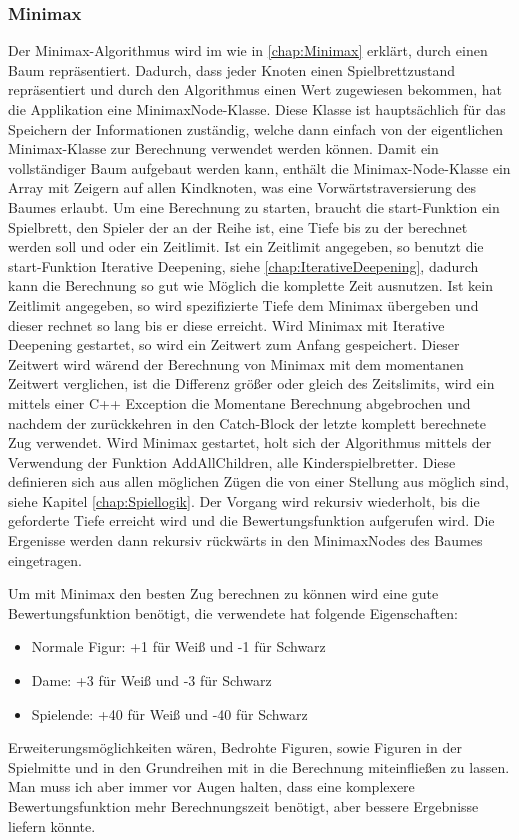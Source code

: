 \documentclass[12pt,a4paper,bibliography=totocnumbered,listof=totocnumbered]{article}
\begin{document}
\subsubsection{Minimax}
Der Minimax-Algorithmus wird im wie in \ref{chap:Minimax} erklärt, durch einen Baum repräsentiert. Dadurch, dass jeder Knoten einen Spielbrettzustand
repräsentiert und durch den Algorithmus einen Wert zugewiesen bekommen, hat die Applikation eine MinimaxNode-Klasse.
Diese Klasse ist hauptsächlich für das Speichern der Informationen zuständig, welche dann einfach von der eigentlichen Minimax-Klasse zur Berechnung
verwendet werden können. Damit ein vollständiger Baum aufgebaut werden kann, enthält die Minimax-Node-Klasse ein Array mit Zeigern auf allen 
Kindknoten, was eine Vorwärtstraversierung des Baumes erlaubt. 
Um eine Berechnung zu starten, braucht die start-Funktion ein Spielbrett, den Spieler der an der Reihe ist, eine
Tiefe bis zu der berechnet werden soll und oder ein Zeitlimit. Ist ein Zeitlimit angegeben, so benutzt die start-Funktion Iterative Deepening, siehe
\ref{chap:IterativeDeepening}, dadurch kann die Berechnung so gut wie Möglich die komplette Zeit ausnutzen. Ist kein Zeitlimit angegeben, 
so wird spezifizierte Tiefe dem Minimax übergeben und dieser rechnet so lang bis er diese erreicht. Wird Minimax mit Iterative Deepening gestartet, so
wird ein Zeitwert zum Anfang gespeichert. Dieser Zeitwert wird wärend der Berechnung von Minimax mit dem momentanen Zeitwert verglichen, ist die 
Differenz größer oder gleich des Zeitslimits, wird ein mittels einer C++ Exception die Momentane Berechnung abgebrochen und nachdem der zurückkehren in 
den Catch-Block der letzte komplett berechnete Zug verwendet. 
Wird Minimax gestartet, holt sich der Algorithmus mittels der Verwendung der Funktion AddAllChildren, alle Kinderspielbretter. Diese 
definieren sich aus allen möglichen Zügen die von einer Stellung aus möglich sind, siehe Kapitel \ref{chap:Spiellogik}. Der Vorgang wird 
rekursiv wiederholt, bis die geforderte Tiefe erreicht wird und die Bewertungsfunktion aufgerufen wird. Die Ergenisse werden dann rekursiv rückwärts in 
den MinimaxNodes des Baumes eingetragen.

Um mit Minimax den besten Zug berechnen zu können wird eine gute Bewertungsfunktion 
benötigt, die verwendete hat folgende Eigenschaften:
\begin{itemize}
    \item Normale Figur: +1 für Weiß und -1 für Schwarz
    \item Dame: +3 für Weiß und -3 für Schwarz
    \item Spielende: +40 für Weiß und -40 für Schwarz
\end{itemize} 
Erweiterungsmöglichkeiten wären, Bedrohte Figuren, sowie Figuren in der Spielmitte und in den Grundreihen mit in die Berechnung miteinfließen zu lassen.
Man muss ich aber immer vor Augen halten, dass eine komplexere Bewertungsfunktion mehr Berechnungszeit benötigt, aber bessere Ergebnisse liefern könnte.
\end{document}
